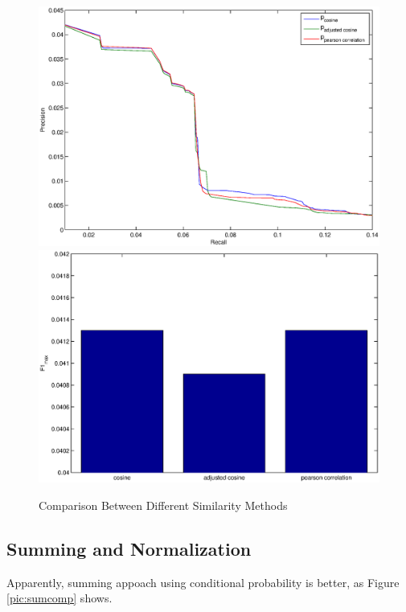\documentclass[11pt,a4paper,titlepage]{article}
\begin{document}
\begin{figure}[!h]
\includegraphics[width=\linewidth]{./sim_compare.eps}
\includegraphics[width=\linewidth]{./sim_compare_f1.eps}
\caption{Comparison Between Different Similarity Methods}
\label{pic:simcomp}
\end{figure}


\subsection{Summing and Normalization}

Apparently, summing appoach using conditional probability is better, as Figure \ref{pic:sumcomp} shows.
\end{document}
